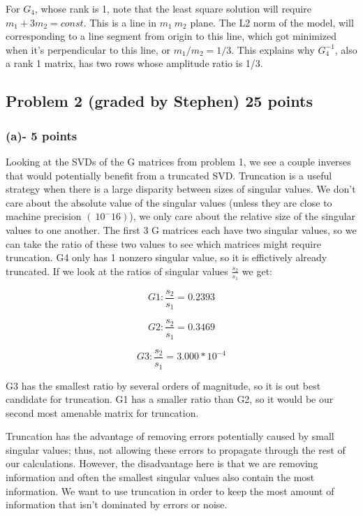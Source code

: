 \documentclass[11pt]{article}
\begin{document}
For $G_4$, whose rank is 1,  note that the least square solution will require $m_1 + 3 m_2 = const$. This is a line in $m_1 ~ m_2$ plane. The L2 norm of the model, will corresponding to a line segment from origin to this line, which got minimized when it's perpendicular to this line, or $m_1 / m_2 = 1 / 3$. This explains why $G_4^{-1}$, also a rank 1 matrix, has two rows whose amplitude ratio is 1/3. 


\subsection*{Problem 2 (graded by Stephen) 25 points}

\subsubsection*{(a)- 5 points}
Looking at the SVDs of the G matrices from problem 1, we see a couple inverses that would potentially benefit from a truncated SVD.  Truncation is a useful strategy when there is a large disparity between sizes of singular values.  We don't care about the absolute value of the singular values (unless they are close to machine precision $(~10^-16)$), we only care about the relative size of the singular values to one another.  The first 3 G matrices each have two singular values, so we can take the ratio of these two values to see which matrices might require truncation.  G4 only has 1 nonzero singular value, so it is effictively already truncated.  If we look at the ratios of singular values $\frac{s_2}{s_1}$ we get:

\begin{equation}
G1: \frac{s_2}{s_1}= 0.2393
\end{equation}

\begin{equation}
G2: \frac{s_2}{s_1}= 0.3469
\end{equation}

\begin{equation}
G3: \frac{s_2}{s_1}= 3.000*10^{-4}
\end{equation}

G3 has the smallest ratio by several orders of magnitude, so it is out best candidate for truncation.
G1 has a smaller ratio than G2, so it would be our second most amenable matrix for truncation.

Truncation has the advantage of removing errors potentially caused by small singular values; thus, not allowing these errors to propagate through the rest of our calculations.  However, the disadvantage here is that we are removing information and often the smallest singular values also contain the most information.  We want to use truncation in order to keep the most amount of information that isn't dominated by errors or noise.
\end{document}
